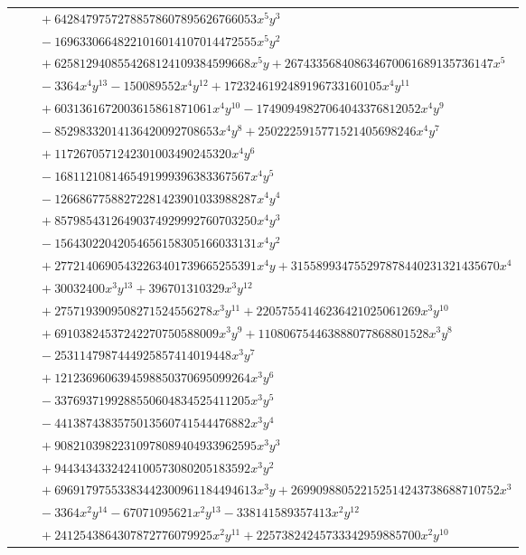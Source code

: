 \documentclass[11pt]{article}
\begin{document}
\begin{longtable}{@{}ll@{}}
 & $\quad +64284797572788578607895626766053x^{5}y^{3}$\\
 & $\quad -16963306648221016014107014472555x^{5}y^{2}$\\
 & $\quad +6258129408554268124109384599668x^{5}y+267433568408634670061689135736147x^{5}$\\
 & $\quad -3364x^{4}y^{13}-150089552x^{4}y^{12}+1723246192489196733160105x^{4}y^{11}$\\
 & $\quad +6031361672003615861871061x^{4}y^{10}-17490949827064043376812052x^{4}y^{9}$\\
 & $\quad -85298332014136420092708653x^{4}y^{8}+2502225915771521405698246x^{4}y^{7}$\\
 & $\quad +1172670571242301003490245320x^{4}y^{6}$\\
 & $\quad -1681121081465491999396383367567x^{4}y^{5}$\\
 & $\quad -12668677588272281423901033988287x^{4}y^{4}$\\
 & $\quad +85798543126490374929992760703250x^{4}y^{3}$\\
 & $\quad -15643022042054656158305166033131x^{4}y^{2}$\\
 & $\quad +27721406905432263401739665255391x^{4}y+315589934755297878440231321435670x^{4}$\\
 & $\quad +30032400x^{3}y^{13}+396701310329x^{3}y^{12}$\\
 & $\quad +2757193909508271524556278x^{3}y^{11}+22057554146236421025061269x^{3}y^{10}$\\
 & $\quad +69103824537242270750588009x^{3}y^{9}+110806754463888077868801528x^{3}y^{8}$\\
 & $\quad -2531147987444925857414019448x^{3}y^{7}$\\
 & $\quad +1212369606394598850370695099264x^{3}y^{6}$\\
 & $\quad -3376937199288550604834525411205x^{3}y^{5}$\\
 & $\quad -4413874383575013560741544476882x^{3}y^{4}$\\
 & $\quad +90821039822310978089404933962595x^{3}y^{3}$\\
 & $\quad +9443434332424100573080205183592x^{3}y^{2}$\\
 & $\quad +69691797553383442300961184494613x^{3}y+269909880522152514243738688710752x^{3}$\\
 & $\quad -3364x^{2}y^{14}-67071095621x^{2}y^{13}-338141589357413x^{2}y^{12}$\\
 & $\quad +2412543864307872776079925x^{2}y^{11}+22573824245733342959885700x^{2}y^{10}$\\

\end{longtable}
\end{document}

